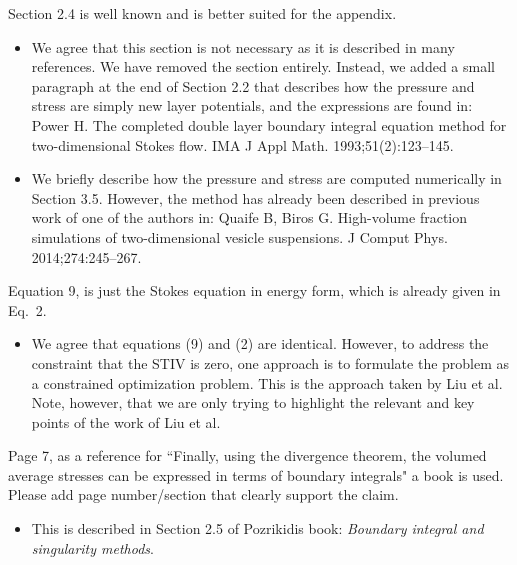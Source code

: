 \documentclass[11pt]{article}
\newcommand{\comment}[1]{{\color{blue} #1}}
\begin{document}
\noindent
\comment{Section 2.4 is well known and is better suited for the
appendix.}
\begin{itemize}
  \item We agree that this section is not necessary as it is described
    in many references.  We have removed the section entirely.  Instead,
    we added a small paragraph at the end of Section 2.2 that describes
    how the pressure and stress are simply new layer potentials, and the
    expressions are found in: \newline
    Power H. The completed double layer boundary integral equation
    method for two-dimensional Stokes flow.  IMA J Appl Math.
    1993;51(2):123--145.

  \item We briefly  describe how the pressure and stress are computed
    numerically in Section 3.5.  However, the method has already been
    described in previous work of one of the authors in: \newline
    Quaife B, Biros G. High-volume fraction simulations of
    two-dimensional vesicle suspensions. J Comput Phys.
    2014;274:245--267.
\end{itemize}


\noindent
\comment{Equation 9, is just the Stokes equation in energy form, which
is already given in Eq.~2.}
\begin{itemize}
  \item We agree that equations (9) and (2) are identical.  However, to
    address the constraint that the STIV is zero, one approach is to
    formulate the problem as a constrained optimization problem.  This
    is the approach taken by Liu et al.  Note, however, that we are only
    trying to highlight the relevant and key points of the work of Liu
    et al.
\end{itemize}

\noindent
\comment{Page 7, as a reference for ``Finally, using the divergence
theorem, the volumed average stresses can be expressed in terms of
boundary integrals" a book is used.  Please add page number/section that
clearly support the claim.}
\begin{itemize}
  \item This is described in Section 2.5 of Pozrikidis book: {\em Boundary
    integral and singularity methods}.
\end{itemize}
\end{document}
